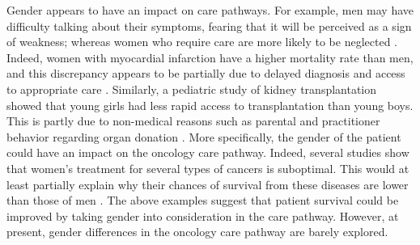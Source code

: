 Gender appears to have an impact on care pathways. For example, men may have difficulty talking about their symptoms, fearing that it will be perceived as a sign of weakness; whereas women who require care are more likely to be neglected \cite{ferrari_gender_2018}. Indeed, women with myocardial infarction have a higher mortality rate than men, and this discrepancy appears to be partially due to delayed diagnosis and access to appropriate care \cite{bugiardini_delayed_2017}. Similarly, a pediatric study of kidney transplantation showed that young girls had less rapid access to transplantation than young boys. This is partly due to non-medical reasons such as parental and practitioner behavior regarding organ donation \cite{hogan_j_gender_2016}.
More specifically, the gender of the patient could have an impact on the oncology care pathway. Indeed, several studies show that women's treatment for several types of cancers is suboptimal. This would at least partially explain why their chances of survival from these diseases are lower than those of men \cite{park_a_undertreatment_2019,carter_paulson_e_gender_2009,rose_sex_2016}.
The above examples suggest that patient survival could be improved by taking gender into consideration in the care pathway. However, at present, gender differences in the oncology care pathway are barely explored.
